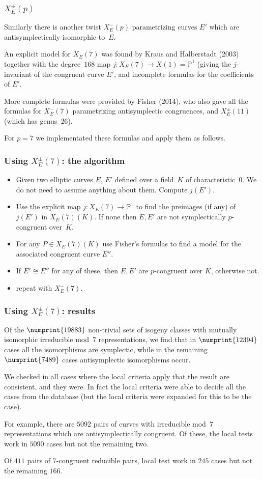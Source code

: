 \documentclass[compress]{beamer}
\newcommand{\PP}{\mathbb P}
\begin{document}
\begin{frame}\frametitle{$X_E^{\pm}(p)$}
Similarly there is another twist $X_E^-(p)$ parametrizing curves $E'$
which are antisymplectically isomorphic to~$E$.
    \pause
  \medskip

An explicit model for $X_E(7)$ was found by Kraus and Halberstadt
(2003) together with the degree~$168$ map $j:X_E(7)\to X(1)=\PP^1$
(giving the $j$-invariant of the congruent curve $E'$, and incomplete
formulas for the coefficients of $E'$.

    \pause
  \medskip
More complete formulas were provided by Fisher (2014), who also gave
all the formulas for $X_E^-(7)$ parametrizing antisymplectic
congruences, and $X_E^{\pm}(11)$ (which has genus~$26$).

    \pause
  \medskip
For $p=7$ we implementated these formulas and apply them as follows.
\end{frame}

\begin{frame}\frametitle{Using $X_E^{\pm}(7)$: the algorithm}
\begin{itemize}
\item Given two elliptic curves $E$, $E'$ defined over a field~$K$ of
  characteristic~$0$. We do not need to assume anything about them.
  Compute $j(E')$.
\item Use the explicit map $j:X_E(7)\to\PP^1$ to find the preimages
  (if any) of $j(E')$ in $X_E(7)(K)$.  If none then $E,E'$ are not
  symplectically $p$-congruent over~$K$.
\item For any $P\in X_E(7)(K)$ use Fisher's formulas to find a model
  for the associated congruent curve $E''$.
\item If $E'\cong E''$ for any of these, then $E,E'$ are $p$-congruent
  over $K$, otherwise not.
\item repeat with $X_E^-(7)$.
\end{itemize}
\end{frame}

\begin{frame}\frametitle{Using $X_E^{\pm}(7)$: results}
Of the $\numprint{19883}$ non-trivial sets of isogeny classes with mutually
isomorphic irreducible mod~$7$ representations, we find that in
$\numprint{12394}$ cases all the isomorphisms are symplectic, while in the
remaining $\numprint{7489}$ cases antisymplectic isomorphisms occur.

We checked in all cases where the local criteria apply that the result
are consistent, and they were.  In fact the local criteria were able
to decide all the cases from the database (but the local criteria were
expanded for this to be the case).

For example, there are $5092$ pairs of curves with irreducible mod~$7$
representations which are antisymplectically congruent.  Of these, the
local tests work in $5090$ cases but not the remaining two.

Of $411$ pairs of $7$-congruent reducible pairs, local test work in
$245$ cases but not the remaining $166$.
\end{frame}
\end{document}

